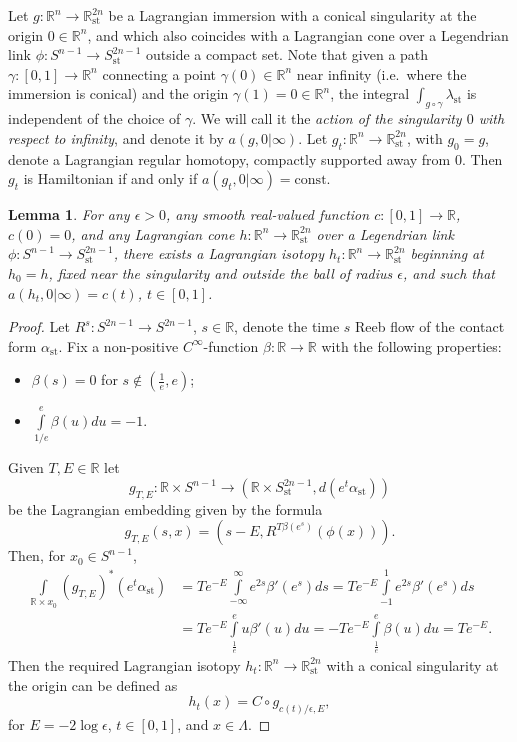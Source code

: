 \documentclass[reqno,11pt]{amsart}
\numberwithin{equation}{section}
\theoremstyle{my}
\theoremstyle{my}
\newtheorem{Lemma}[thm]{Lemma}
\theoremstyle{your}
\newcommand{\R}{\mathbb{R}}
\newcommand{\st}{\mathrm{st}}
\newcommand{\const}{\mathrm{const}}
\newcommand{\eps}{\epsilon}
\begin{document}
 {Let  $g\colon\R^n\to\R^{2n}_\st$ be a Lagrangian immersion with a conical singularity at the origin $0\in\R^n$, and  which also coincides with a Lagrangian cone over a Legendrian link $\phi\colon S^{n-1}\to S^{2n-1}_\st$ outside a compact set.
Note that given a path  $\gamma\colon[0,1]\to\R^n$ connecting a point $\gamma(0)\in\R^n$ near infinity (i.e.~where the immersion is conical) and the origin $\gamma(1)=0\in\R^n$, the integral 
$\int_{g\circ\gamma}\lambda_\st$ is independent of the choice of $\gamma$. We will call it the {\em action of the singularity $0$ with respect to infinity}, and denote it by $a(g,0|\infty)$. 
Let $g_t\colon\R^n\to\R^{2n}_\st$, with $g_0 = g$, denote a Lagrangian regular homotopy,  compactly supported away from $0$.  Then $g_t$ is Hamiltonian if and only if $a(g_t,0|\infty)=\const$.
\begin{Lemma} \label{lm:compensation}
For any $\eps>0$, any smooth real-valued function $c\colon[0,1]\to\R$, $c(0)=0$, and any  Lagrangian cone  $h\colon\R^n\to\R^{2n}_\st$  over a Legendrian link $\phi\colon S^{n-1}\to S^{2n-1}_\st$, there exists a Lagrangian isotopy
$h_t\colon\R^n\to \R^{2n}_\st$ beginning at $h_0=h$, fixed near the singularity and outside the ball of radius $\eps$, and such that $a(h_t,0|\infty)=c(t)$, $t\in[0,1]$.
\end{Lemma}
\begin{proof}
Let $R^s\colon S^{2n-1}\to S^{2n-1}$, $s\in\R$, denote the time $s$ Reeb flow of the contact form $\alpha_\st$. Fix a non-positive $C^\infty$-function $\beta\colon\R\to\R$  with the following properties:
\begin{itemize}
\item  $\beta(s)=0$ for $s\notin(\frac1e,e)$;
\item $\int\limits_{ 1/e}^e \beta(u)du=-1$.
\end{itemize}
 Given $T,E\in\R$ let  
$$
g_{T,E}\colon\R\times S^{n-1}\to 
(\R\times S^{2n-1}_\st,d(e^t\alpha_\st))
$$ 
be the Lagrangian embedding given by the formula
$$
g_{T,E}(s,x)=(s-E,R^{T\beta(e^s)}(\phi(x))).
$$
Then, for $x_0\in S^{n-1}$,
\begin{align*}
\int\limits_{\R\times x_0}\left(g_{T,E}\right)^*(e^t\alpha_\st) &= Te^{-E}\int\limits_{-\infty}^\infty e^{2s} \beta'(e^s)ds = Te^{-E}\int\limits_{-1}^1 e^{2s} \beta'(e^s)ds\\ 
&=
Te^{-E}\int\limits_{\frac1e}^e u \beta'(u)du=-Te^{-E}\int\limits_{\frac1e}^e\beta(u)du=Te^{-E}.
\end{align*}
Then the required Lagrangian isotopy $h_t\colon\R^n\to \R^{2n}_\st$ 
with a conical singularity at the origin can be defined as
$$
h_t(x)=
C\circ g_{ {c(t)}/\eps,E},
$$
for $E=-2\log\eps$, $t\in[0,1]$, and $x\in\Lambda$.
\end{proof}
}
\end{document}
